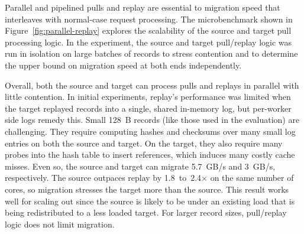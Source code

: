 Parallel and pipelined pulls and replay are essential to migration speed that
interleaves with normal-case request processing. The microbenchmark shown in
Figure~\ref{fig:parallel-replay} explores the scalability of the source and
target pull processing logic. In the experiment, the source and target
pull/replay logic was run in isolation on large batches of records to stress
contention and to determine the upper bound on migration speed at both ends
independently.

Overall, both the source and target can process pulls and replays in parallel with
little contention. In initial experiments, replay's performance was limited when the
target replayed records into a single, shared in-memory log, but per-worker side logs
remedy this. Small 128~B records (like those used in the evaluation) are
challenging. They require computing hashes and checksums over many small log
entries on both the source and target. On the target, they also require many
probes into the hash table to insert references, which induces many costly
cache misses. Even so, the source and target can migrate 5.7~GB/s and
3~GB/s,
respectively. The source outpaces replay by 1.8~to~2.4$\times$ on the
same number of cores, so migration stresses the target more than the source.
This result works well for scaling out since the source is likely to be under an
existing load that is being redistributed to a less loaded target. For larger
record sizes, pull/replay logic does not limit migration.

